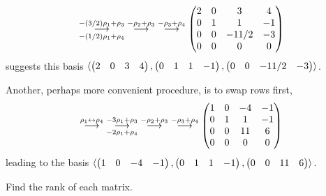 \begin{exercises}
\begin{answer}
\begin{equation*}
       \grstep[-(1/2)\rho_1+\rho_4]{-(3/2)\rho_1+\rho_3}
       \;\grstep{-\rho_2+\rho_3}
       \;\grstep{-\rho_3+\rho_4}
       \begin{pmatrix}
         2  &0  &3      &4   \\
         0  &1  &1      &-1 \\
         0  &0  &-11/2  &-3  \\
         0  &0  &0      &0
       \end{pmatrix}
     \end{equation*}
     suggests this basis
     $\sequence{\rowvec{2 &0 &3 &4},
         \rowvec{0 &1 &1 &-1},\rowvec{0 &0 &-11/2 &-3}}$.

      Another, perhaps more convenient procedure, is to swap rows first,
      \begin{equation*}
        \grstep{\rho_1\swap\rho_4}
        \;\grstep[-2\rho_1+\rho_4]{-3\rho_1+\rho_3}
        \;\grstep{-\rho_2+\rho_3}
        \;\grstep{-\rho_3+\rho_4}
        \begin{pmatrix}
           1  &0  &-4 &-1 \\
           0  &1  &1  &-1 \\
           0  &0  &11 &6  \\
           0  &0  &0  &0
         \end{pmatrix}
      \end{equation*}
      leading to the basis
      \( \sequence{\rowvec{1 &0 &-4 &-1},\rowvec{0 &1 &1 &-1},
                   \rowvec{0 &0 &11 &6}} \).  
    \end{answer}
  \recommended \item 
    Find the rank of each matrix.
\end{exercises}
